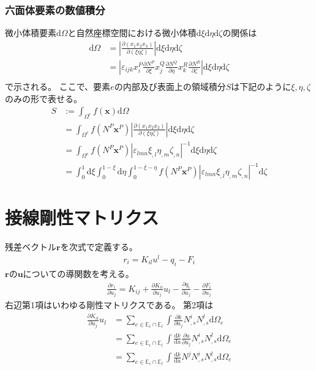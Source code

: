 \documentclass{jarticle}
\begin{document}
\subsubsection{六面体要素の数値積分}
微小体積要素$\mathrm{d}\Omega$と自然座標空間における微小体積$\mathrm{d}\xi\mathrm{d}\eta\mathrm{d}\zeta$の関係は
\begin{align}
  \mathrm{d}\Omega
  &= \left|\frac{\partial (x_1x_2x_3)}{\partial (\xi\eta\zeta)}\right|\mathrm{d}\xi\mathrm{d}\eta\mathrm{d}\zeta\\
  &= \left|\varepsilon_{ijk}x^{P}_{i}\frac{\partial N^P}{\partial \xi}x^{Q}_{j}\frac{\partial N^Q}{\partial \eta}x^{R}_{k}\frac{\partial N^R}{\partial \zeta}\right|\mathrm{d}\xi\mathrm{d}\eta\mathrm{d}\zeta\\
\end{align}
で示される。
ここで、要素$e$の内部及び表面上の領域積分$S$は下記のように$\xi, \eta, \zeta$のみの形で表せる。
\begin{align}
  S&:=\int_{\Omega^e}f(\bm{x})\mathrm{d}\Omega\\
  &=\int_{\Omega^e}f(N^P\bm{x}^P)\left|\frac{\partial (x_1x_2x_3)}{\partial (\xi\eta\zeta)}\right|\mathrm{d}\xi\mathrm{d}\eta\mathrm{d}\zeta\\
  &=\int_{\Omega^e}f(N^P\bm{x}^P)\left|\varepsilon_{lmn}\xi_{,l}\eta_{,m}\zeta_{,n}\right|^{-1}\mathrm{d}\xi\mathrm{d}\eta\mathrm{d}\zeta  \\
  &=\int_{0}^1\mathrm{d}\xi\int_{0}^{1-\xi}\mathrm{d}\eta\int_{0}^{1-\xi-\eta}f(N^P\bm{x}^P)\left|\varepsilon_{lmn}\xi_{,l}\eta_{,m}\zeta_{,n}\right|^{-1}\mathrm{d}\zeta 
\end{align}
\section{接線剛性マトリクス}
残差ベクトル$\bm{r}$を次式で定義する。
\begin{align}
  r_{i} = K_{il}u^{l} - q_{i} - F_i
\end{align}
$\bm{r}$の$\bm{u}$についての導関数を考える。
\begin{align}
  \frac{\partial r_i}{\partial u_j} = K_{ij} + \frac{\partial K_{il}}{\partial u_{j}}u_l -  \frac{\partial q_i}{\partial u_j} -  \frac{\partial F_i}{\partial u_j}
\end{align}
右辺第1項はいわゆる剛性マトリクスである。
第2項は
\begin{align}
  \frac{\partial K_{il}}{\partial u_{j}}u_l
  &= \sum_{e \in \mathbb{E}_i\cap\mathbb{E}_l} \int \frac{\partial k}{\partial u_{j}}N^i_{,s}N^l_{,s}\mathrm{d}\Omega_e\\
  &= \sum_{e \in \mathbb{E}_i\cap\mathbb{E}_l} \int \frac{\mathrm{d} k}{\mathrm{d} u}\frac{\partial u}{\partial u_j}N^i_{,s}N^l_{,s}\mathrm{d}\Omega_e\\
  &= \sum_{e \in \mathbb{E}_i\cap\mathbb{E}_l} \int \frac{\mathrm{d} k}{\mathrm{d} u}N^jN^i_{,s}N^l_{,s}\mathrm{d}\Omega_e
\end{align}
\end{document}
